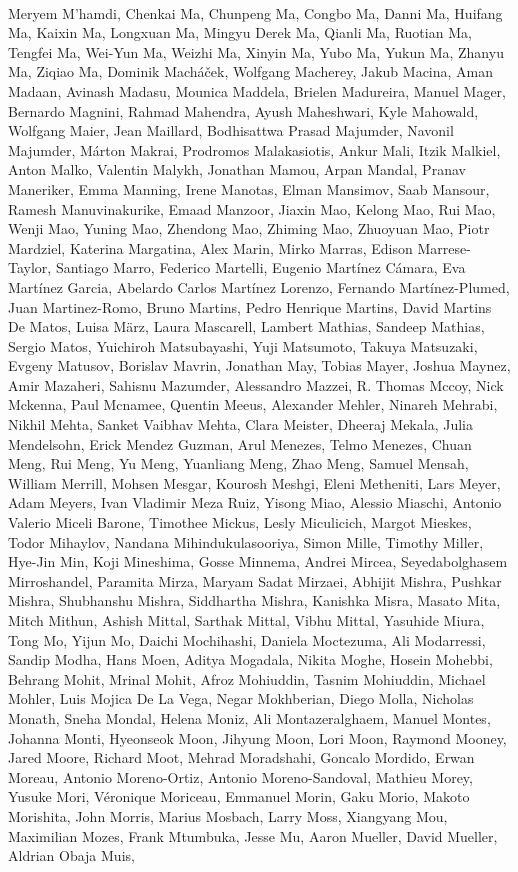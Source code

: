\paragraph{}Meryem M'hamdi, Chenkai Ma, Chunpeng Ma, Congbo Ma, Danni Ma, Huifang Ma, Kaixin Ma, Longxuan Ma, Mingyu Derek Ma, Qianli Ma, Ruotian Ma, Tengfei Ma, Wei-Yun Ma, Weizhi Ma, Xinyin Ma, Yubo Ma, Yukun Ma, Zhanyu Ma, Ziqiao Ma, Dominik Macháček, Wolfgang Macherey, Jakub Macina, Aman Madaan, Avinash Madasu, Mounica Maddela, Brielen Madureira, Manuel Mager, Bernardo Magnini, Rahmad Mahendra, Ayush Maheshwari, Kyle Mahowald, Wolfgang Maier, Jean Maillard, Bodhisattwa Prasad Majumder, Navonil Majumder, Márton Makrai, Prodromos Malakasiotis, Ankur Mali, Itzik Malkiel, Anton Malko, Valentin Malykh, Jonathan Mamou, Arpan Mandal, Pranav Maneriker, Emma Manning, Irene Manotas, Elman Mansimov, Saab Mansour, Ramesh Manuvinakurike, Emaad Manzoor, Jiaxin Mao, Kelong Mao, Rui Mao, Wenji Mao, Yuning Mao, Zhendong Mao, Zhiming Mao, Zhuoyuan Mao, Piotr Mardziel, Katerina Margatina, Alex Marin, Mirko Marras, Edison Marrese-Taylor, Santiago Marro, Federico Martelli, Eugenio Martínez Cámara, Eva Martínez Garcia, Abelardo Carlos Martínez Lorenzo, Fernando Martínez-Plumed, Juan Martinez-Romo, Bruno Martins, Pedro Henrique Martins, David Martins De Matos, Luisa März, Laura Mascarell, Lambert Mathias, Sandeep Mathias, Sergio Matos, Yuichiroh Matsubayashi, Yuji Matsumoto, Takuya Matsuzaki, Evgeny Matusov, Borislav Mavrin, Jonathan May, Tobias Mayer, Joshua Maynez, Amir Mazaheri, Sahisnu Mazumder, Alessandro Mazzei, R. Thomas Mccoy, Nick Mckenna, Paul Mcnamee, Quentin Meeus, Alexander Mehler, Ninareh Mehrabi, Nikhil Mehta, Sanket Vaibhav Mehta, Clara Meister, Dheeraj Mekala, Julia Mendelsohn, Erick Mendez Guzman, Arul Menezes, Telmo Menezes, Chuan Meng, Rui Meng, Yu Meng, Yuanliang Meng, Zhao Meng, Samuel Mensah, William Merrill, Mohsen Mesgar, Kourosh Meshgi, Eleni Metheniti, Lars Meyer, Adam Meyers, Ivan Vladimir Meza Ruiz, Yisong Miao, Alessio Miaschi, Antonio Valerio Miceli Barone, Timothee Mickus, Lesly Miculicich, Margot Mieskes, Todor Mihaylov, Nandana Mihindukulasooriya, Simon Mille, Timothy Miller, Hye-Jin Min, Koji Mineshima, Gosse Minnema, Andrei Mircea, Seyedabolghasem Mirroshandel, Paramita Mirza, Maryam Sadat Mirzaei, Abhijit Mishra, Pushkar Mishra, Shubhanshu Mishra, Siddhartha Mishra, Kanishka Misra, Masato Mita, Mitch Mithun, Ashish Mittal, Sarthak Mittal, Vibhu Mittal, Yasuhide Miura, Tong Mo, Yijun Mo, Daichi Mochihashi, Daniela Moctezuma, Ali Modarressi, Sandip Modha, Hans Moen, Aditya Mogadala, Nikita Moghe, Hosein Mohebbi, Behrang Mohit, Mrinal Mohit, Afroz Mohiuddin, Tasnim Mohiuddin, Michael Mohler, Luis Mojica De La Vega, Negar Mokhberian, Diego Molla, Nicholas Monath, Sneha Mondal, Helena Moniz, Ali Montazeralghaem, Manuel Montes, Johanna Monti, Hyeonseok Moon, Jihyung Moon, Lori Moon, Raymond Mooney, Jared Moore, Richard Moot, Mehrad Moradshahi, Goncalo Mordido, Erwan Moreau, Antonio Moreno-Ortiz, Antonio Moreno-Sandoval, Mathieu Morey, Yusuke Mori, Véronique Moriceau, Emmanuel Morin, Gaku Morio, Makoto Morishita, John Morris, Marius Mosbach, Larry Moss, Xiangyang Mou, Maximilian Mozes, Frank Mtumbuka, Jesse Mu, Aaron Mueller, David Mueller, Aldrian Obaja Muis, 